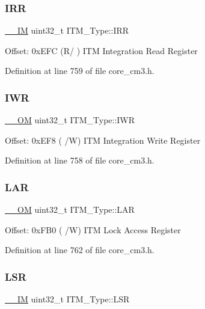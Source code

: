 \subsubsection{\texorpdfstring{I\+RR}{IRR}}
{\footnotesize\ttfamily \hyperlink{core__sc300_8h_a4cc1649793116d7c2d8afce7a4ffce43}{\+\_\+\+\_\+\+IM} uint32\+\_\+t I\+T\+M\+\_\+\+Type\+::\+I\+RR}

Offset\+: 0x\+E\+FC (R/ ) I\+TM Integration Read Register 

Definition at line 759 of file core\+\_\+cm3.\+h.

\mbox{\label{struct_i_t_m___type_aa9da04891e48d1a2f054de186e9c4c94}} 
\subsubsection{\texorpdfstring{I\+WR}{IWR}}
{\footnotesize\ttfamily \hyperlink{core__sc300_8h_a0ea2009ed8fd9ef35b48708280fdb758}{\+\_\+\+\_\+\+OM} uint32\+\_\+t I\+T\+M\+\_\+\+Type\+::\+I\+WR}

Offset\+: 0x\+E\+F8 ( /W) I\+TM Integration Write Register 

Definition at line 758 of file core\+\_\+cm3.\+h.

\mbox{\label{struct_i_t_m___type_a7f9c2a2113a11c7f3e98915f95b669d5}} 
\subsubsection{\texorpdfstring{L\+AR}{LAR}}
{\footnotesize\ttfamily \hyperlink{core__sc300_8h_a0ea2009ed8fd9ef35b48708280fdb758}{\+\_\+\+\_\+\+OM} uint32\+\_\+t I\+T\+M\+\_\+\+Type\+::\+L\+AR}

Offset\+: 0x\+F\+B0 ( /W) I\+TM Lock Access Register 

Definition at line 762 of file core\+\_\+cm3.\+h.

\mbox{\label{struct_i_t_m___type_a3861c67933a24dd6632288c4ed0b80c8}} 
\subsubsection{\texorpdfstring{L\+SR}{LSR}}
{\footnotesize\ttfamily \hyperlink{core__sc300_8h_a4cc1649793116d7c2d8afce7a4ffce43}{\+\_\+\+\_\+\+IM} uint32\+\_\+t I\+T\+M\+\_\+\+Type\+::\+L\+SR}

